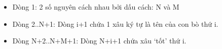 \begin{itemize}
	\item     Dòng 1: 2 số nguyên cách nhau bởi dấu cách: N và M   
	\item     Dòng 2..N+1: Dòng i+1 chứa 1 xâu ký tự là tên của con bò thứ i.   
	\item     Dòng N+2..N+M+1: Dòng N+i+1 chứa xâu ‘tốt’ thứ i.   
\end{itemize}